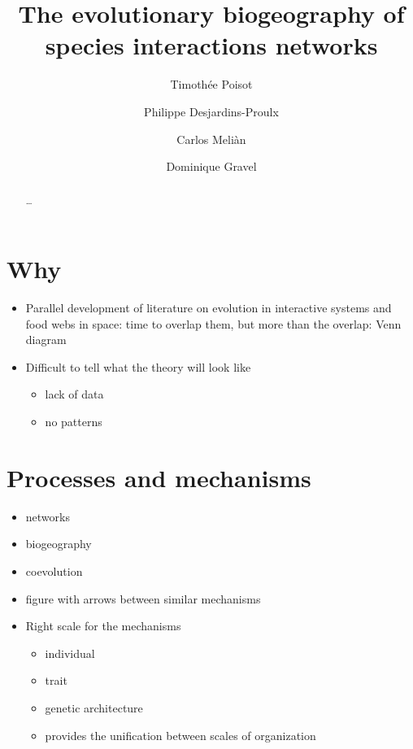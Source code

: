\documentclass[11pt,oneside]{scrartcl}
\title{The evolutionary biogeography of species interactions networks}
\author{Timoth\'ee Poisot \and Philippe Desjardins-Proulx \and Carlos Meli\`an \and Dominique Gravel}
\begin{document}
\maketitle
\begin{abstract}
	\ldots 
\end{abstract}
\doublespacing


\section{Why}
\label{why}

\begin{itemize}

\item Parallel development of literature on evolution in interactive systems and
food webs in space: time to overlap them, but more than the overlap: Venn
diagram


\item Difficult to tell what the theory will look like

\begin{itemize}

\item lack of data
\item no patterns
\end{itemize}


\end{itemize}

\section{Processes and mechanisms}
\label{processesandmechanisms}

\begin{itemize}
	\item networks
	\item biogeography 
	\item coevolution
	\item figure with arrows between similar mechanisms
	\item Right scale for the mechanisms
		\begin{itemize}
			\item individual
			\item trait
			\item genetic architecture
			\item provides the unification between scales of organization
		\end{itemize}
\end{itemize}
\end{document}

